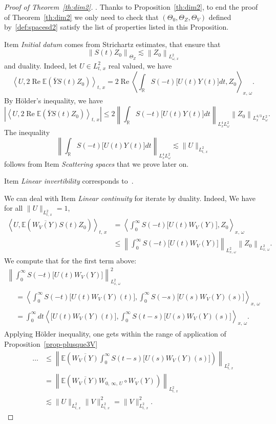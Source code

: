 \documentclass[AHL, Unicode, longabstracts,published]{cedram}
\newcommand{\R}{\mathbb{R}}
\newcommand{\E}{\mathbb{E}}
\DeclareMathOperator{\re}{Re}
\begin{document}
\begin{proof}[Proof of Theorem~\ref{th:dim2}].
Thanks to Proposition~\ref{th:dim2}, to end the proof of Theorem~\ref{th:dim2} we only need to check that $(\Theta_0,\Theta_Z,\Theta_V)$ defined by~\eqref{def:spacesd2} satisfy the list of properties listed in this Proposition.

Item \emph{Initial datum} comes from Strichartz estimates, that ensure that
\[
\left\|S(t)Z_0\right\|_{\Theta_Z} \lesssim \left\|Z_0\right\|_{L^2_{\omega,\,x}}
\]
and duality. Indeed, let $U \in L^2_{t,\,x}$ real valued, we have
\[
\left\langle U, 2\re \E \left(\bar Y S(t) Z_0\right)\right\rangle_{t,\,x} = 2\re \left\langle\int_{\R} S(-t) \big[U(t)Y(t)\big] dt, Z_0\right\rangle_{x,\,\omega}.
\]
By H\"older's inequality, we have
\[
\left|\left\langle U, 2\re \E \left(\bar Y S(t) Z_0\right)\right\rangle_{t,\,x}\right| \leq 2\left\|\int_{\R} S(-t) \big[U(t)Y(t)\big] dt\right\|_{L^4_x L^2_\omega} \left\|Z_0\right\|_{L^{4/3}_x L^2_\omega}.
\]
The inequality
\[
\left\|\int_{\R} S(-t) \big[U(t)Y(t)\big] dt\right\|_{L^4_x L^2_\omega} \lesssim \|U\|_{L^2_{t,\,x}}
\]
follows from Item \emph{Scattering spaces} that we prove later on.


Item \emph{Linear invertibility} corresponds to~\cite[Proposition~1 and Corollary~1]{lewsab2}.

We can deal with Item \emph{Linear continuity} for iterate by duality. Indeed, We have for all $\| U\|_{L^2_{t,\,x}}=1$,
\begin{align*}
\left\langle U,\E \left(\overline{W_V(Y)} S(t) Z_0\right)\right\rangle_{t,\,x} &= \left\langle\int_{0}^\infty S(-t) \big[U(t)W_V(Y)\big],Z_0\right\rangle_{x,\,\omega} \\
&\leq \left\| \int_{0}^\infty S(-t) \big[U(t)W_V(Y)\big]\right\|_{L^2_{x,\,\omega}} \left\|Z_0\right\|_{L^2_{x,\,\omega}}.
\end{align*}
We compute that for the first term above:
\begin{multline*}
\left\| \int_{0}^\infty S(-t) \big[U(t)W_V(Y)\big]\right\|_{L^2_{x,\,\omega}}^2\\
\begin{aligned}
& = \left\langle \int_{0}^\infty S(-t) \big[U(t)W_V(Y)(t)\big], \int_{0}^\infty S(-s)\big[U(s)W_V(Y)(s)\big]\right\rangle_{x,\,\omega} \\
& = \int_{0}^\infty dt \left\langle \big[U(t)W_V(Y)(t)\big], \int_{0}^\infty S(t-s)\big[U(s)W_V(Y)(s)\big]\right\rangle_{x,\,\omega}.
\end{aligned}
\end{multline*}
Applying H\"older inequality, one gets within the range of application of Proposition~\ref{prop-plusque3V}
\begin{align*}
\dots &\leq \left\| \E\left(\overline{W_V(Y)} \int_{0}^\infty S(t - s) \big[U(s)W_V(Y)(s)\big]\right) \right\|_{L^2_{t,\,x}}\\
&=\left\| \E\left(\overline{W_V(Y)} W_{0,\,\infty,\,U}\circ W_V(Y)\right)\right\|_{L^2_{t,\,x}}\\
&\lesssim \| U \|_{L^2_{t,\,x}} \| V \|_{L^2_{t,\,x}}^2 = \| V \|_{L^2_{t,\,x}}^2.
\end{align*}


\end{proof}
\end{document}
